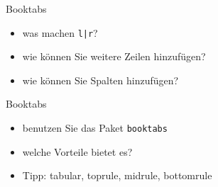 \begin{frame}{Booktabs}

\begin{itemize}
\item was machen \texttt{l|r}?
\item wie können Sie weitere Zeilen hinzufügen?
\item wie können Sie Spalten hinzufügen?
\end{itemize}

\end{frame}

\begin{frame}{Booktabs}

\begin{itemize}
\item benutzen Sie das Paket \texttt{booktabs}
\item welche Vorteile bietet es?
 \item Tipp: tabular, toprule, midrule, bottomrule
\end{itemize}

\end{frame}